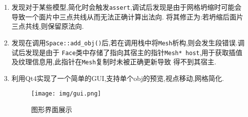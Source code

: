 \begin{enumerate}
  \item 发现对于某些模型,简化时会触发\verb|assert|,调试后发现是由于网格坍缩时可能会导致一个面片中三点共线从而无法正确计算出法向.
    将其修正为:若坍缩后面片三点共线,则保留原法向.

  \item 发现在调用\verb|Space::add_obj()|后,若在调用栈中将\verb|Mesh|析构,则会发生段错误.调试后发现是由于
    \verb|Face|类中存储了指向其宿主的指针\verb|Mesh* host|,用于获取插值及纹理信息用,此指针在\verb|Mesh|复制时未被正确更新导致
    得不到其宿主.


  \item 利用Qt4实现了一个简单的GUI,支持单个obj的预览,视点移动,网格简化.

    \begin{figure}[H]
      \centering
      \texttt{[image: img/gui.png]}
      \caption{图形界面展示\label{fig:gui}}
    \end{figure}


\end{enumerate}
